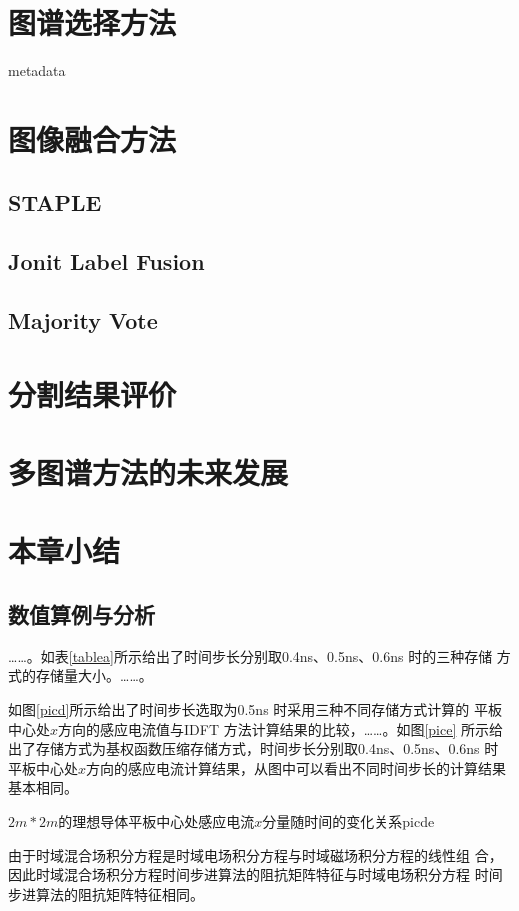 \section{图谱选择方法}

metadata\par

\section{图像融合方法}
\subsection{STAPLE}
\subsection{Jonit Label Fusion}
\subsection{Majority Vote}

\section{分割结果评价}

\section{多图谱方法的未来发展}

\section{本章小结}


\subsection{数值算例与分析}
……。如表\ref{tablea}所示给出了时间步长分别取0.4ns、0.5ns、0.6ns 时的三种存储
方式的存储量大小。……。

如图\ref{picd}所示给出了时间步长选取为0.5ns 时采用三种不同存储方式计算的
平板中心处$x$方向的感应电流值与IDFT 方法计算结果的比较，……。如图\ref{pice}
所示给出了存储方式为基权函数压缩存储方式，时间步长分别取0.4ns、0.5ns、0.6ns
时平板中心处$x$方向的感应电流计算结果，从图中可以看出不同时间步长的计算结果基本相同。

\begin{pics}[h]{$2m*2m$的理想导体平板中心处感应电流$x$分量随时间的变化关系}{picde}
\end{pics}
%
由于时域混合场积分方程是时域电场积分方程与时域磁场积分方程的线性组
合，因此时域混合场积分方程时间步进算法的阻抗矩阵特征与时域电场积分方程
时间步进算法的阻抗矩阵特征相同。
